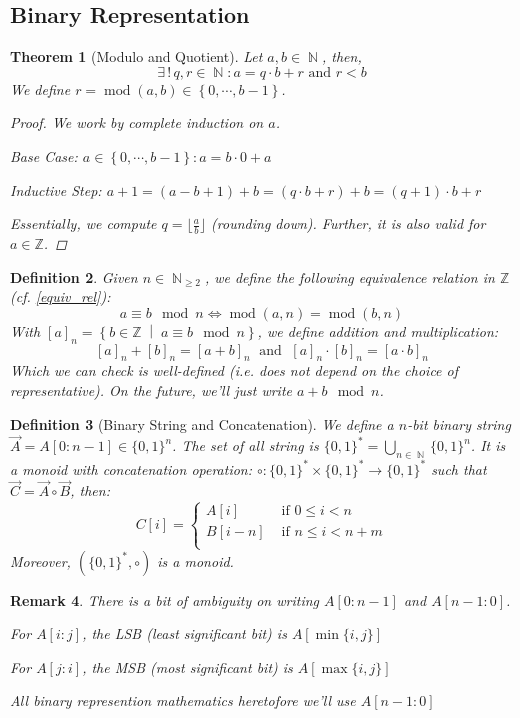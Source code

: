 \documentclass[12pt]{article}
\let\LR\Leftrightarrow
\newcommand{\set}[2]{\left\{{#1}\;\middle|\;{#2}\right\}}
\newcommand{\Exist}[1]{\exists\,{#1}:}
\newcommand{\seq}[2][0]{\left\{{#1},\cdots,{#2}\right\}}
\DeclareMathOperator{\N}{\mathbb{N}}
\DeclareMathOperator{\fmod}{mod}
\newcommand*{\B}{\{0,1\}}
\newtheorem{theorem}{Theorem}[subsection]
\newtheorem{definition}[theorem]{Definition}
\newtheorem{remark}[theorem]{Remark}
\begin{document}
\pagebreak

\subsection{Binary Representation}

\begin{theorem}[Modulo and Quotient]
  \label{modulo}
  Let $a,b\in \N$, then, $$\Exist{!\,q,r\in \N} a=q\cdot b+r\text{ and }r<b$$
  We define $r= \fmod(a,b)\in\seq{b-1}$.
  \begin{proof}
    We work by complete induction on $a$.
    \begin{compactitem}
      \item Base Case: $a\in\seq{b-1}:a=b\cdot 0+a$
      \item Inductive Step: $a+1=(a-b+1)+b=(q\cdot b+r)+b=(q+1)\cdot b+r$
    \end{compactitem}
    Essentially, we compute $q=\lfloor\frac{a}{b}\rfloor$ (rounding down). Further, it is also valid for $a\in\mathbb{Z}$.
  \end{proof}
\end{theorem}

\begin{definition}
  Given $n\in\N_{\geq 2}$, we define the following equivalence relation in $\mathbb{Z}$ (cf. \ref{equiv_rel}): $$a\equiv b\mod n\LR \fmod(a,n) = \fmod(b,n)$$
  With $[a]_n=\set{b\in\mathbb{Z}}{a\equiv b\mod n}$, we define addition and multiplication: $$[a]_n+[b]_n=[a+b]_n\;\text{ and }\;[a]_n\cdot[b]_n=[a\cdot b]_n$$
  Which we can check is well-defined (i.e. does not depend on the choice of representative). On the future, we'll just write $a+b\mod n$.
\end{definition}

\begin{definition}[Binary String and Concatenation]
  We define a $n$-bit binary string $\vec{A}=A[0\colon n-1]\in\B^n$. The set of all string is $\B^*=\bigcup_{n\in\N} \B^n$. It is a monoid with concatenation operation: $\circ:\B^*\times \B^*\to \B^*$ such that $\vec{C}=\vec{A}\circ\vec{B}$, then: $$C[i]=\begin{cases}
    A[i]&\text{ if }0\leq i< n\\
    B[i-n]&\text{ if }n\leq i<n+m\\
  \end{cases}$$
  Moreover, $(\B^*,\circ)$ is a monoid.
\end{definition}

\begin{remark}
  There is a bit of ambiguity on writing $A[0:n-1]$ and $A[n-1:0]$.
  \begin{compactitem}
    \item For $A[i:j]$, the LSB (least significant bit) is $A[\min\{i,j\}]$
    \item For $A[j:i]$, the MSB (most significant bit) is $A[\max\{i,j\}]$
  \end{compactitem}
  All binary represention mathematics heretofore we'll use $A[n-1:0]$
\end{remark}
\end{document}
